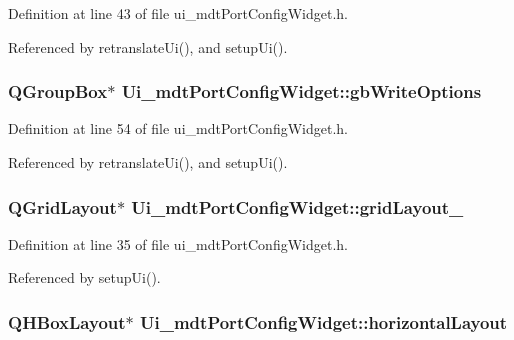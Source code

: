 Definition at line 43 of file ui\-\_\-mdt\-Port\-Config\-Widget.\-h.



Referenced by retranslate\-Ui(), and setup\-Ui().

\hypertarget{class_ui__mdt_port_config_widget_addba4da32474b69228ea901c798c9141}{
\subsubsection[{gb\-Write\-Options}]{\setlength{\rightskip}{0pt plus 5cm}Q\-Group\-Box$\ast$ Ui\-\_\-mdt\-Port\-Config\-Widget\-::gb\-Write\-Options}}\label{class_ui__mdt_port_config_widget_addba4da32474b69228ea901c798c9141}


Definition at line 54 of file ui\-\_\-mdt\-Port\-Config\-Widget.\-h.



Referenced by retranslate\-Ui(), and setup\-Ui().

\hypertarget{class_ui__mdt_port_config_widget_a8884949275b265ab5237387853caa3f2}{
\subsubsection[{grid\-Layout\-\_\-3}]{\setlength{\rightskip}{0pt plus 5cm}Q\-Grid\-Layout$\ast$ Ui\-\_\-mdt\-Port\-Config\-Widget\-::grid\-Layout\-\_}}\label{class_ui__mdt_port_config_widget_a8884949275b265ab5237387853caa3f2}


Definition at line 35 of file ui\-\_\-mdt\-Port\-Config\-Widget.\-h.



Referenced by setup\-Ui().

\hypertarget{class_ui__mdt_port_config_widget_a460469cd300019bbca6f85af5f13796a}{
\subsubsection[{horizontal\-Layout}]{\setlength{\rightskip}{0pt plus 5cm}Q\-H\-Box\-Layout$\ast$ Ui\-\_\-mdt\-Port\-Config\-Widget\-::horizontal\-Layout}}\label{class_ui__mdt_port_config_widget_a460469cd300019bbca6f85af5f13796a}



